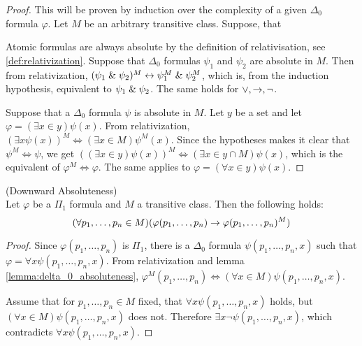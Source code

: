 \begin{proof}
This will be proven by induction over the complexity of a given $\Delta_0$ formula $\varphi$. Let $M$ be an arbitrary transitive class. Suppose, that 

Atomic formulas are always absolute by the definition of relativisation, see \ref{def:relativization}.
Suppose that $\Delta_0$ formulas $\psi_1$ and $\psi_2$ are absolute in $M$. Then from relativization, $(\psi_1 \mathrel{\&} \psi_2)^M \leftrightarrow \psi_1^M \mathrel{\&} \psi_2^M$, which is, from the induction hypothesis, equivalent to $\psi_1 \mathrel{\&} \psi_2$. The same holds for $\lor, \rightarrow, \neg$.

Suppose that a $\Delta_0$ formula $\psi$ is absolute in $M$. Let $y$ be a set and let $\varphi = (\exists x \in y) \psi(x)$. 
From relativization, $(\exists x \psi(x))^M \iff (\exists x \in M) \psi^M(x)$. Since the hypotheses makes it clear that $\psi^M \iff \psi$, we get $((\exists x \in y) \psi(x))^M \iff (\exists x \in y\cap M) \psi(x)$, which is the equivalent of $\varphi^M \iff \varphi$. The same applies to $\varphi = (\forall x \in y) \psi(x)$.
\end{proof}

\begin{lemma}{(Downward Absoluteness)}\label{lemma:downward_absoluteness}\\
Let $\varphi$ be a $\Pi_1$ formula and $M$ a transitive class. Then the following holds:
\begin{equation}
(\forall p_1, \ldots, p_n \in M)(\varphi(p_1, \ldots, p_n) \rightarrow \varphi(p_1, \ldots, p_n)^M)
\end{equation}
\end{lemma}
\begin{proof}
Since $\varphi(p_1, \ldots, p_n)$ is $\Pi_1$, there is a $\Delta_0$ formula $\psi(p_1, \ldots, p_n, x)$ such that $\varphi = \forall x \psi(p_1, \ldots, p_n, x)$. From relativization and lemma \ref{lemma:delta_0_absoluteness}, $\varphi^M(p_1, \ldots, p_n) \iff (\forall x \in M)\psi(p_1, \ldots, p_n, x)$.

Assume that for $p_1, \ldots, p_n \in M$ fixed, that $\forall x \psi(p_1, \ldots, p_n, x)$ holds, but $(\forall x \in M)\psi(p_1, \ldots, p_n, x)$ does not. 
Therefore $\exists x \neg \psi(p_1, \ldots, p_n, x)$, which contradicts $\forall x \psi(p_1, \ldots, p_n, x)$.
\end{proof}


